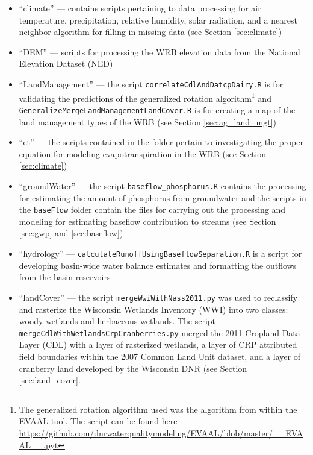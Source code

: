 \begin{itemize}
\item ``climate'' --- contains scripts pertaining to data processing for air temperature, precipitation, relative humidity, solar radiation, and a nearest neighbor algorithm for filling in missing data (see Section \ref{sec:climate})

\item ``DEM'' --- scripts for processing the WRB elevation data from the National Elevation Dataset (NED)

\item ``LandManagement'' --- the script \texttt{correlateCdlAndDatcpDairy.R} is for validating the predictions of the generalized rotation algorithm\footnote{The generalized rotation algorithm used was the algorithm from within the EVAAL tool. The script can be found here \url{https://github.com/dnrwaterqualitymodeling/EVAAL/blob/master/__EVAAL__.pyt}} and \texttt{GeneralizeMergeLandManagementLandCover.R} is for creating a map of the land management types of the WRB (see Section \ref{sec:ag_land_mgt})

\item ``et'' --- the scripts contained in the folder pertain to investigating the proper equation for modeling evapotranspiration in the WRB (see Section \ref{sec:climate})

\item ``groundWater'' --- the script \texttt{baseflow\_phosphorus.R} contains the processing for estimating the amount of phosphorus from groundwater and the scripts in the \texttt{baseFlow} folder contain the files for carrying out the processing and modeling for estimating baseflow contribution to streams (see Section \ref{sec:gwp} and \ref{sec:baseflow})

\item ``hydrology'' --- \texttt{calculateRunoffUsingBaseflowSeparation.R} is a script for developing  basin-wide water balance estimates and formatting the outflows from the basin reservoirs

\item ``landCover'' --- the script \texttt{mergeWwiWithNass2011.py} was used to reclassify and rasterize the Wisconsin Wetlands Inventory (WWI) into two classes: woody wetlands and herbaceous wetlands. The script \texttt{mergeCdlWithWetlandsCrpCranberries.py} merged the 2011 Cropland Data Layer (CDL) with a layer of  rasterized wetlands, a layer of CRP attributed field boundaries within the 2007 Common Land Unit dataset, and a layer of cranberry land developed by the Wisconsin DNR (see Section \ref{sec:land_cover}.


\end{itemize}
